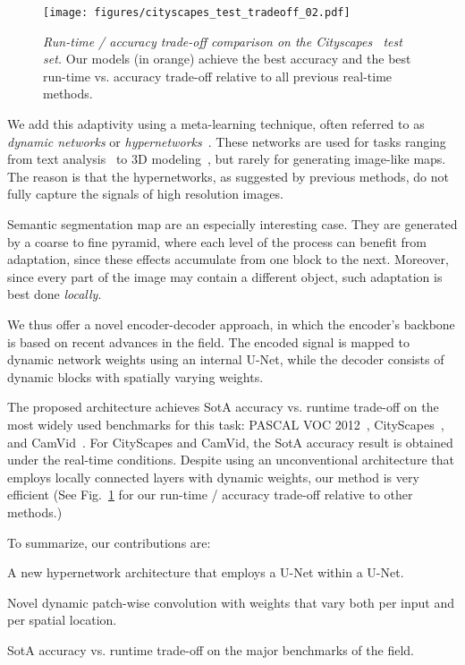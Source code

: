 \documentclass[final]{cvpr}
\newenvironment{tight_itemize}{
\begin{itemize}
  \setlength{\topsep}{0pt}
  \setlength{\itemsep}{2pt}
  \setlength{\parskip}{0pt}
  \setlength{\parsep}{0pt}
}{\end{itemize}}
\begin{document}
\begin{figure}[t]
\centering
\texttt{[image: figures/cityscapes\_test\_tradeoff\_02.pdf]}
\caption{\emph{Run-time / accuracy trade-off comparison on the Cityscapes~\cite{cordts2016cityscapes} test set.} Our models (in orange) achieve the best accuracy and the best run-time vs. accuracy trade-off relative to all previous real-time methods.}
\vspace{-4mm}
\label{fig:cityscapes_test_tradeoff}
\end{figure}

We add this adaptivity using a meta-learning technique, often referred to as {\em dynamic networks} or {\em hypernetworks}~\cite{ha2016hypernetworks}. These networks are used for tasks ranging from text analysis~\cite{ha2016hypernetworks,wu2019pay} to 3D modeling~\cite{littwin2019deep,sitzmann2020implicit}, but rarely for generating image-like maps. The reason is that the hypernetworks, as suggested by previous methods, do not fully capture the signals of high resolution images.



Semantic segmentation map are an especially interesting case. They are generated by a coarse to fine pyramid, where each level of the process can benefit from adaptation, since these effects accumulate from one block to the next. Moreover, since every part of the image may contain a different object, such adaptation is best done {\em locally}. 



We thus offer a novel encoder-decoder approach, in which the encoder's backbone is based on recent advances in the field. The encoded signal is mapped to dynamic network weights using an internal U-Net, while the decoder consists of dynamic blocks with spatially varying weights.

The proposed architecture achieves SotA accuracy vs. runtime trade-off on the most widely used benchmarks for this task: PASCAL VOC 2012~\cite{everingham2010pascal}, CityScapes~\cite{cordts2016cityscapes}, and CamVid~\cite{brostow2009semantic}. For CityScapes and CamVid, the SotA accuracy result is obtained under the real-time conditions. Despite using an unconventional architecture that employs locally connected layers with dynamic weights, our method is very efficient (See Fig.~\ref{fig:cityscapes_test_tradeoff} for our run-time / accuracy trade-off relative to other methods.) 

To summarize, our contributions are:
\begin{tight_itemize}
\item A new hypernetwork architecture that employs a U-Net within a U-Net.
\item Novel dynamic patch-wise convolution with weights that vary both per input and per spatial location.
\item SotA accuracy vs. runtime trade-off on the major benchmarks of the field.
\end{tight_itemize}
\end{document}
